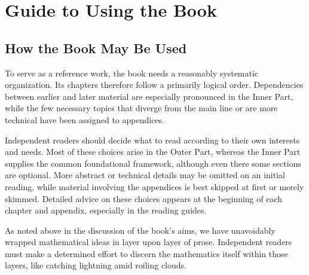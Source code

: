 
\section*{Guide to Using the Book}
\hypertarget{o014.aljabr2.prelude.reader-guide}{ }

\subsection*{How the Book May Be Used}

To serve as a reference work, the book needs a reasonably systematic organization. Its chapters therefore follow a primarily logical order. Dependencies between earlier and later material are especially pronounced in the Inner Part, while the few necessary topics that diverge from the main line or are more technical have been assigned to appendices.

Independent readers should decide what to read according to their own interests and needs. Most of these choices arise in the Outer Part, whereas the Inner Part supplies the common foundational framework, although even there some sections are optional. More abstract or technical details may be omitted on an initial reading, while material involving the appendices is best skipped at first or merely skimmed. Detailed advice on these choices appears at the beginning of each chapter and appendix, especially in the reading guides.

As noted above in the discussion of the book's aims, we have unavoidably wrapped mathematical ideas in layer upon layer of prose. Independent readers must make a determined effort to discern the mathematics itself within those layers, like catching lightning amid roiling clouds.

